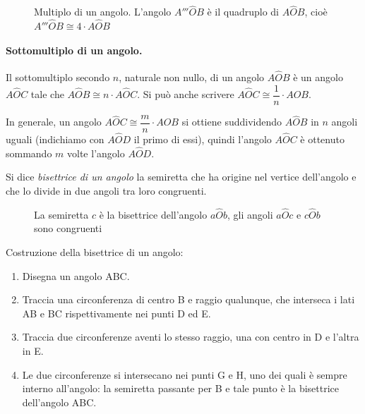 \begin{inaccessibleblock}
 \begin{figure}[htb]
\centering
\caption{Multiplo di un angolo. L'angolo $A'''\widehat{O}B$ è il 
quadruplo di $A\widehat{O}B$, cioè $A'''\widehat{O}B \cong 4\cdot 
A\widehat{O}B$}
\end{figure}
\end{inaccessibleblock}

\paragraph{Sottomultiplo di un angolo.} Il sottomultiplo secondo $n$, 
naturale non nullo, di un angolo $A\widehat{O}B$ è un angolo 
$A\widehat{O}C$ tale che $A\widehat{O}B \cong n\cdot A\widehat{O}C$. 
Si può anche scrivere $A\widehat{O}C\cong \dfrac{1}{n}\cdot 
A\widehat{O}B$.

In generale, un angolo $A\widehat{O}C\cong\dfrac{m}{n}\cdot 
A\widehat{O}B$ si ottiene suddividendo $A\widehat{O}B$ in $n$ angoli 
uguali (indichiamo con $A\widehat{O}D$ il primo di essi), quindi 
l'angolo $A\widehat{O}C$ è ottenuto sommando $m$ volte l'angolo 
$A\widehat{O}D$.

\begin{definizione}
Si dice \emph{bisettrice di un angolo} la semiretta che ha origine 
nel vertice dell'angolo e che lo divide in due angoli tra loro 
congruenti.
\end{definizione}


\begin{inaccessibleblock}
 \begin{figure}[htb]
\centering
\caption{La semiretta $c$ è la bisettrice dell'angolo 
$a\widehat{O}b$, gli angoli $a\widehat{O}c$ e $c\widehat{O}b$ sono 
congruenti}
\end{figure}
\end{inaccessibleblock}

\begin{procedura}
	Costruzione della bisettrice di un angolo:
	\begin{enumerate} [nosep]
		\item 
		Disegna un angolo ABC.
		\item 
		Traccia una circonferenza di centro B e raggio qualunque, che interseca i 
		lati AB e BC rispettivamente nei punti D ed E.
		\item 
		Traccia due circonferenze aventi lo stesso raggio, una con centro in D e 
		 l'altra in E.
		\item 
		Le due circonferenze si intersecano nei punti G e H, uno dei quali è sempre 
		interno all'angolo: la semiretta passante per B e tale punto è la bisettrice 
		dell'angolo ABC.		
	\end{enumerate}
\end{procedura}


